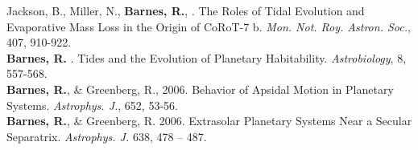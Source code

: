 \documentclass[12pt]{article}
\begin{document}
Jackson, B., Miller, N., \textbf{Barnes, R.}, . The Roles of Tidal Evolution and Evaporative Mass Loss in the Origin of CoRoT-7 b. {\it Mon. Not. Roy. Astron. Soc.}, 
\vspace{0.1cm}
407, 910-922.\\
\textbf{Barnes, R.} . Tides and the Evolution of Planetary Habitability. {\it Astrobiology}, 8,
\vspace{0.1cm}
557-568.\\
\textbf{Barnes, R.}, \& Greenberg, R., 2006. Behavior of Apsidal Motion in
Planetary Systems. 
\vspace{0.1cm}
\textit{Astrophys. J.}, 652, 53-56.\\
\textbf{Barnes, R.}, \& Greenberg, R. 2006. Extrasolar Planetary Systems
  Near a Secular Separatrix. {\it Astrophys. J.} 638, 478 -- 487. \\
\end{document}
